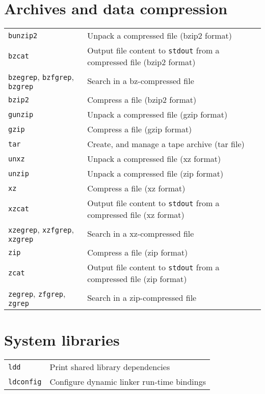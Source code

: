 \documentclass[10pt]{article}
\begin{document}
\begin{multicols}{2} 

\section{Archives and data compression}

\begin{tabular}{ p{2.5cm} p{8.5cm} }
  \hline 
  \texttt{bunzip2} & Unpack a compressed file (bzip2 format) \\
  \texttt{bzcat} & Output file content to \texttt{stdout} from a compressed file (bzip2 format)\\
  \texttt{bzegrep}, \texttt{bzfgrep}, \texttt{bzgrep} & Search in a bz-compressed file \\
  \texttt{bzip2} & Compress a file (bzip2 format) \\
  \texttt{gunzip} & Unpack a compressed file (gzip format) \\
  \texttt{gzip} & Compress a file (gzip format) \\
  \texttt{tar} & Create, and manage a tape archive (tar file) \\
  \texttt{unxz} & Unpack a compressed file (xz format) \\
  \texttt{unzip} & Unpack a compressed file (zip format) \\
  \texttt{xz} & Compress a file (xz format) \\
  \texttt{xzcat} & Output file content to \texttt{stdout} from a compressed file (xz format) \\
  \texttt{xzegrep}, \texttt{xzfgrep}, \texttt{xzgrep} & Search in a xz-compressed file \\
  \texttt{zip} & Compress a file (zip format) \\
  \texttt{zcat} & Output file content to \texttt{stdout} from a compressed file (zip format) \\
  \texttt{zegrep}, \texttt{zfgrep}, \texttt{zgrep} & Search in a zip-compressed file \\
  \hline
\end{tabular}

\section{System libraries}
\begin{tabular}{ p{2.5cm} p{8.5cm} }
  \hline 
  \texttt{ldd} & Print shared library dependencies \\
  \texttt{ldconfig} & Configure dynamic linker run-time bin\-dings
  \\
  \hline
\end{tabular}


\end{multicols}
\end{document}
